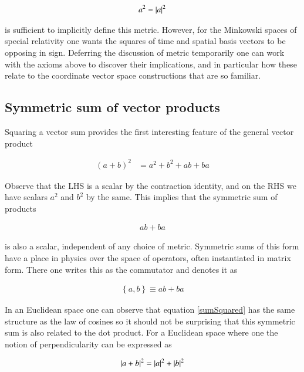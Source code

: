 \documentclass{article}
\newcommand{\symmetric}[2]{{\left\{{#1},{#2}\right\}}}
\begin{document}
\begin{align}
a^2 = \left\lvert{a}\right\rvert^2
\end{align}

is sufficient to implicitly define this metric.  However, for the Minkowski spaces of special relativity one wants the squares of time and spatial basis vectors to be opposing in sign.  Deferring the discussion of metric temporarily one can work with the axioms above to discover their implications, and in particular how these relate to the coordinate vector space constructions that are so familiar.

\subsection{ Symmetric sum of vector products }

Squaring a vector sum provides the first interesting feature of the general vector product

\begin{align}\label{sumSquared}
(a + b)^2 %
&= a^2 + b^2 + a b + b a
\end{align}

Observe that the LHS is a scalar by the contraction identity, and on the RHS we have scalars $a^2$ and $b^2$ by the same.  This implies that the symmetric sum of products

\begin{align*}
a b + b a
\end{align*}

is also a scalar, independent of any choice of metric.  Symmetric sums of this form have a place in physics over the space of operators, often instantiated in matrix form.  There one writes this as the commutator and denotes it as

\begin{align}\label{eqn:anticommutator}
\symmetric{a}{b} \equiv a b + b a
\end{align}

In an Euclidean space one can observe that equation \ref{sumSquared} has the same structure as the law of cosines so it should not be surprising that this symmetric sum is also related to the dot product.  For a Euclidean space where one the notion of perpendicularity can be expressed as

\begin{align*}
\left\lvert{ a + b }\right\rvert^2 = \left\lvert{a}\right\rvert^2 + \left\lvert{b}\right\rvert^2
\end{align*}
\end{document}
